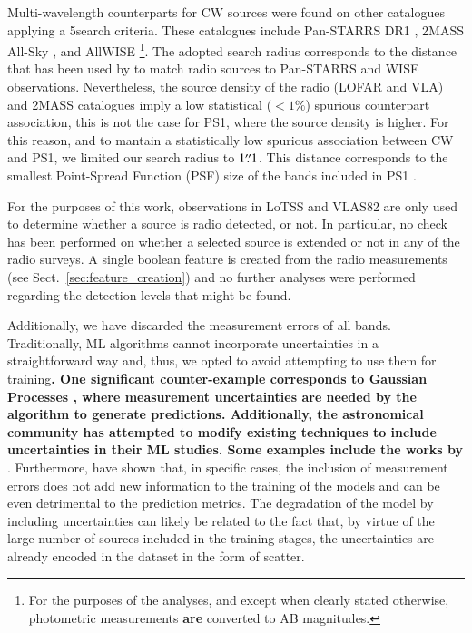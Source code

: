 \documentclass{aa}
\begin{document}
Multi-wavelength counterparts for CW sources were found on other catalogues applying a 5\arcsec search criteria. These catalogues include Pan-STARRS DR1 \citep[PS1;][]{2016arXiv161205560C, 2020ApJS..251....7F}, 2MASS All-Sky \citep[2M;][]{2006AJ....131.1163S, 2003tmc..book.....C, 2003yCat.2246....0C}, and AllWISE \citep[AW;][]{2013wise.rept....1C}\footnote{For the purposes of the analyses, and except when clearly stated otherwise, photometric measurements \textbf{are} converted to AB magnitudes.}. The adopted search radius corresponds to the distance that has been used by \citet{2010AJ....140.1868W} to match radio sources to Pan-STARRS and WISE observations. Nevertheless, the source density of the radio (LOFAR and VLA) and 2MASS catalogues imply a low statistical ($<1\%$) spurious counterpart association, this is not the case for PS1, where the source density is higher. For this reason, and to mantain a statistically low spurious association between CW and PS1, we limited our search radius to $1\overset{\prime\prime}{.} 1$. This distance corresponds to the smallest Point-Spread Function (PSF) size of the bands included in PS1 \citep{2016arXiv161205560C}.

For the purposes of this work, observations in LoTSS and VLAS82 are only used to determine whether a source is radio detected, or not. In particular, no check has been performed on whether a selected source is extended or not in any of the radio surveys. A single boolean feature is created from the radio measurements (see Sect.~\ref{sec:feature_creation}) and no further analyses were performed regarding the detection levels that might be found.

Additionally, we have discarded the measurement errors of all bands. Traditionally, ML algorithms cannot incorporate uncertainties in a straightforward way and, thus, we opted to avoid attempting to use them for training\textbf{. One significant counter-example corresponds to Gaussian Processes \citep[GPs;][]{rasmussen2006gaussian}, where measurement uncertainties are needed by the algorithm to generate predictions. Additionally, the astronomical community has attempted to modify existing techniques to include uncertainties in their ML studies. Some examples include the works by} \citet{2008ApJ...683...12B, 2019AJ....157...16R, 2022AJ....164....6S}. Furthermore, \citet{2023A&A...671A..99E} have shown that, in specific cases, the inclusion of measurement errors does not add new information to the training of the models and can be even detrimental to the prediction metrics. The degradation of the model by including uncertainties can likely be related to the fact that, by virtue of the large number of sources included in the training stages, the uncertainties are already encoded in the dataset in the form of scatter.
\end{document}
